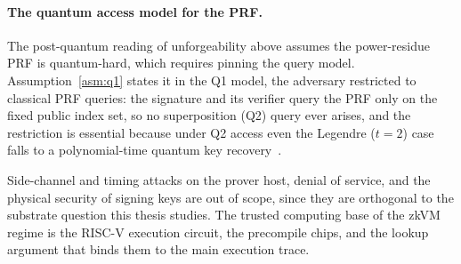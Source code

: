 \paragraph{The quantum access model for the PRF.}
The post-quantum reading of unforgeability above assumes the power-residue PRF is quantum-hard, which requires pinning the query model. Assumption~\ref{asm:q1} states it in the Q1 model, the adversary restricted to classical PRF queries: the signature and its verifier query the PRF only on the fixed public index set, so no superposition (Q2) query ever arises, and the restriction is essential because under Q2 access even the Legendre ($t{=}2$) case falls to a polynomial-time quantum key recovery~\cite{vandamhallgrenip2006}.

Side-channel and timing attacks on the prover host, denial of service, and the physical security of signing keys are out of scope, since they are orthogonal to the substrate question this thesis studies. The trusted computing base of the zkVM regime is the RISC-V execution circuit, the precompile chips, and the lookup argument that binds them to the main execution trace.

